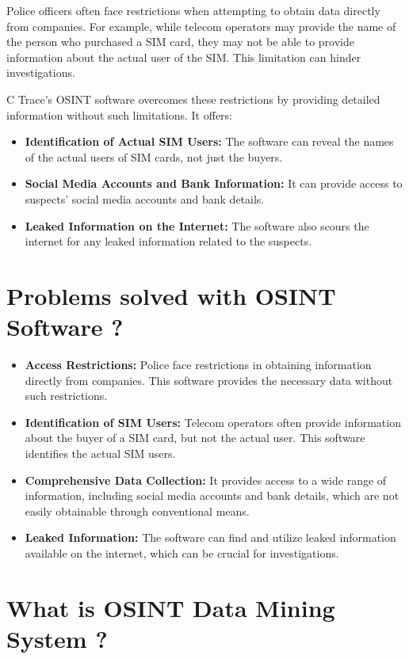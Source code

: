 Police officers often face restrictions when attempting to obtain data directly from companies. For example, while telecom operators may provide the name of the person who purchased a SIM card, they may not be able to provide information about the actual user of the SIM. This limitation can hinder investigations.

C Trace's OSINT software overcomes these restrictions by providing detailed information without such limitations. It offers:

\begin{itemize}
    \item \textbf{Identification of Actual SIM Users:} The software can reveal the names of the actual users of SIM cards, not just the buyers.
    \item \textbf{Social Media Accounts and Bank Information:} It can provide access to suspects' social media accounts and bank details.
    \item \textbf{Leaked Information on the Internet:} The software also scours the internet for any leaked information related to the suspects.
\end{itemize}

\section{Problems solved with OSINT Software ?}\label{sec:problems-solved-with-osint-software-?}

\begin{itemize}
    \item \textbf{Access Restrictions:} Police face restrictions in obtaining information directly from companies. This software provides the necessary data without such restrictions.
    \item \textbf{Identification of SIM Users:} Telecom operators often provide information about the buyer of a SIM card, but not the actual user. This software identifies the actual SIM users.
    \item \textbf{Comprehensive Data Collection:} It provides access to a wide range of information, including social media accounts and bank details, which are not easily obtainable through conventional means.
    \item \textbf{Leaked Information:} The software can find and utilize leaked information available on the internet, which can be crucial for investigations.
\end{itemize}

\section{What is OSINT Data Mining System ?}\label{sec:what-is-osint-data-mining-system-?}

